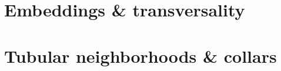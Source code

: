 \documentclass[../geometry_main.tex]{subfiles}
\begin{document}
\section{Embeddings \& transversality}



\section{Tubular neighborhoods \& collars}
\end{document}
